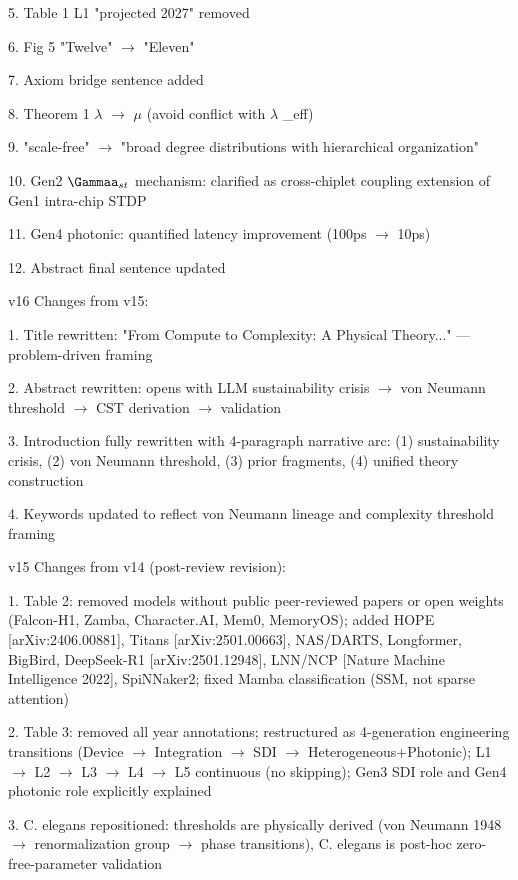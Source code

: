 \documentclass[a4paper,12pt]{article}
\begin{document}
5. Table 1 L1 "projected 2027" removed

6. Fig 5 "Twelve"  $\rightarrow$  "Eleven"

7. Axiom bridge sentence added

8. Theorem 1  $\lambda$   $\rightarrow$   $\mu$  (avoid conflict with  $\lambda$ \_eff)

9. "scale-free"  $\rightarrow$  "broad degree distributions with hierarchical organization"

10. Gen2 $\Gammaa_{st}$ mechanism: clarified as cross-chiplet coupling extension of Gen1 intra-chip STDP

11. Gen4 photonic: quantified latency improvement (100ps $\rightarrow$ 10ps)

12. Abstract final sentence updated

v16 Changes from v15:

1. Title rewritten: "From Compute to Complexity: A Physical Theory..." --- problem-driven framing

2. Abstract rewritten: opens with LLM sustainability crisis  $\rightarrow$  von Neumann threshold  $\rightarrow$  CST derivation  $\rightarrow$  validation

3. Introduction fully rewritten with 4-paragraph narrative arc: (1) sustainability crisis, (2) von Neumann threshold, (3) prior fragments, (4) unified theory construction

4. Keywords updated to reflect von Neumann lineage and complexity threshold framing

v15 Changes from v14 (post-review revision):

1. Table 2: removed models without public peer-reviewed papers or open weights (Falcon-H1, Zamba, Character.AI, Mem0, MemoryOS); added HOPE [arXiv:2406.00881], Titans [arXiv:2501.00663], NAS/DARTS, Longformer, BigBird, DeepSeek-R1 [arXiv:2501.12948], LNN/NCP [Nature Machine Intelligence 2022], SpiNNaker2; fixed Mamba classification (SSM, not sparse attention)

2. Table 3: removed all year annotations; restructured as 4-generation engineering transitions (Device $\rightarrow$ Integration $\rightarrow$ SDI $\rightarrow$ Heterogeneous+Photonic); L1 $\rightarrow$ L2 $\rightarrow$ L3 $\rightarrow$ L4 $\rightarrow$ L5 continuous (no skipping); Gen3 SDI role and Gen4 photonic role explicitly explained

3. C. elegans repositioned: thresholds are physically derived (von Neumann 1948  $\rightarrow$  renormalization group  $\rightarrow$  phase transitions), C. elegans is post-hoc zero-free-parameter validation
\end{document}
